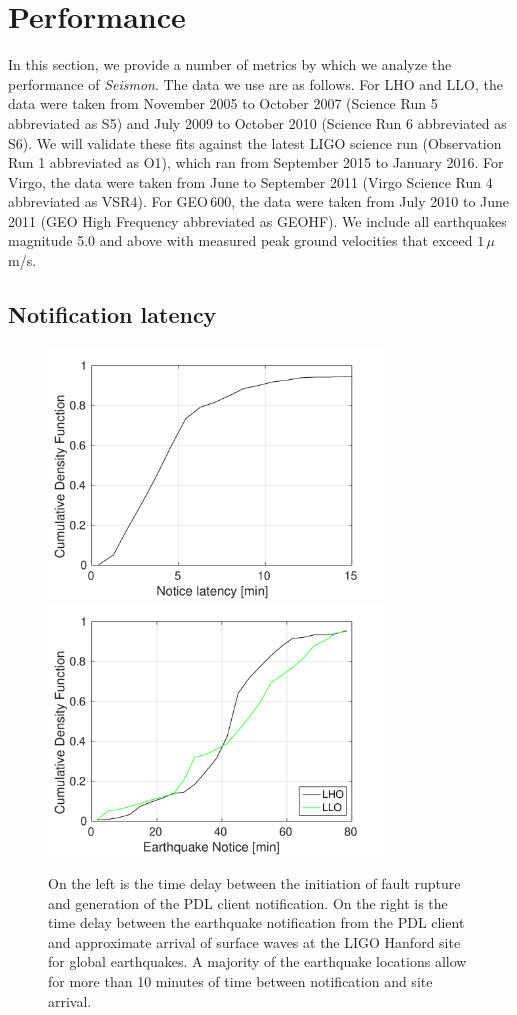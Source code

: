 \documentclass[twocolumn, aps, superscriptaddress]{revtex4}
\begin{document}
\section{Performance}
\label{sec:performance}

In this section, we provide a number of metrics by which we analyze the performance of \emph{Seismon}. The data we use are as follows. For LHO and LLO, the data were taken from November 2005 to October 2007 (Science Run 5 abbreviated as S5) and July 2009 to October 2010 (Science Run 6 abbreviated as S6). We will validate these fits against the latest LIGO science run (Observation Run 1 abbreviated as O1), which ran from September 2015 to January 2016. For Virgo, the data were taken from June to September 2011 (Virgo Science Run 4 abbreviated as VSR4). For GEO\,600, the data were taken from July 2010 to June 2011 (GEO High Frequency abbreviated as GEOHF). We include all earthquakes magnitude 5.0 and above with measured peak ground velocities that exceed $1\,\mu$m/s.

\subsection{Notification latency}

\begin{figure}[t]
\hspace*{-0.5cm}
 \includegraphics[width=3.5in]{earthquake_notice.pdf}
 \includegraphics[width=3.5in]{lockloss_notice.pdf}
 \caption{On the left is the time delay between the initiation of fault rupture and generation of the PDL client notification. On the right is the time delay between the earthquake notification from the PDL client and approximate arrival of surface waves at the LIGO Hanford site for global earthquakes. A majority of the earthquake locations allow for more than 10 minutes of time between notification and site arrival.}
 \label{fig:delays}
\end{figure}
\end{document}

